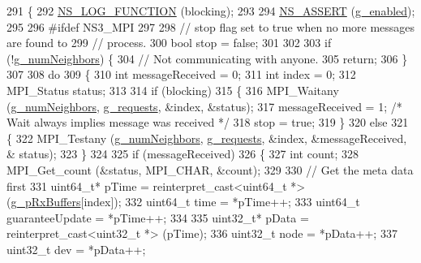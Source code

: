 \begin{DoxyCode}
291 \{
292   \hyperlink{log-macros-disabled_8h_a90b90d5bad1f39cb1b64923ea94c0761}{NS\_LOG\_FUNCTION} (blocking);
293 
294   \hyperlink{assert_8h_a6dccdb0de9b252f60088ce281c49d052}{NS\_ASSERT} (\hyperlink{classns3_1_1NullMessageMpiInterface_ab4002d79e5319aae80e5bc39251ba609}{g\_enabled});
295 
296 \textcolor{preprocessor}{#ifdef NS3\_MPI}
297 
298   \textcolor{comment}{// stop flag set to true when no more messages are found to}
299   \textcolor{comment}{// process.}
300   \textcolor{keywordtype}{bool} stop = \textcolor{keyword}{false};
301 
302 
303   \textcolor{keywordflow}{if} (!\hyperlink{classns3_1_1NullMessageMpiInterface_afb1c81a47bce9a9b80fea71c80a66ef9}{g\_numNeighbors}) \{
304     \textcolor{comment}{// Not communicating with anyone.}
305     \textcolor{keywordflow}{return};
306   \}
307 
308   \textcolor{keywordflow}{do}
309     \{
310       \textcolor{keywordtype}{int} messageReceived = 0;
311       \textcolor{keywordtype}{int} index = 0;
312       MPI\_Status status;
313 
314       \textcolor{keywordflow}{if} (blocking)
315         \{
316           MPI\_Waitany (\hyperlink{classns3_1_1NullMessageMpiInterface_afb1c81a47bce9a9b80fea71c80a66ef9}{g\_numNeighbors}, \hyperlink{classns3_1_1NullMessageMpiInterface_a8a48f62af92d9d68b83296c0a3ddbb3f}{g\_requests}, &index, &status);
317           messageReceived = 1; \textcolor{comment}{/* Wait always implies message was received */}
318           stop = \textcolor{keyword}{true};
319         \}
320       \textcolor{keywordflow}{else}
321         \{
322           MPI\_Testany (\hyperlink{classns3_1_1NullMessageMpiInterface_afb1c81a47bce9a9b80fea71c80a66ef9}{g\_numNeighbors}, \hyperlink{classns3_1_1NullMessageMpiInterface_a8a48f62af92d9d68b83296c0a3ddbb3f}{g\_requests}, &index, &messageReceived, &
      status);
323         \}
324 
325       \textcolor{keywordflow}{if} (messageReceived)
326         \{
327           \textcolor{keywordtype}{int} count;
328           MPI\_Get\_count (&status, MPI\_CHAR, &count);
329 
330           \textcolor{comment}{// Get the meta data first}
331           uint64\_t* pTime = \textcolor{keyword}{reinterpret\_cast<}uint64\_t *\textcolor{keyword}{>} (\hyperlink{classns3_1_1NullMessageMpiInterface_ab6aaed51bb851d090273d5c44fe2aec0}{g\_pRxBuffers}[index]);
332           uint64\_t time = *pTime++;
333           uint64\_t guaranteeUpdate = *pTime++;
334 
335           uint32\_t* pData = \textcolor{keyword}{reinterpret\_cast<}uint32\_t *\textcolor{keyword}{>} (pTime);
336           uint32\_t node = *pData++;
337           uint32\_t dev  = *pData++;

\end{DoxyCode}
